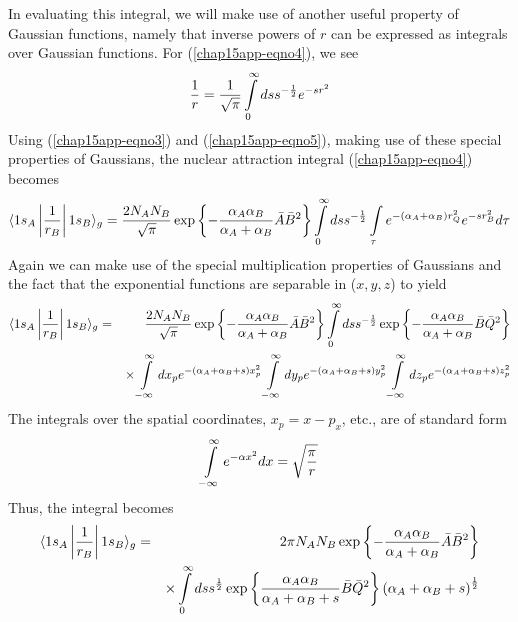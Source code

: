 In evaluating this integral, we will make use of another useful
property of Gaussian functions, namely that inverse powers of $r$ can
be expressed as integrals over Gaussian functions. For
(\ref{chap15app-eqno4}), we see
\begin{equation}
{1 \over r} = {1 \over \sqrt{\pi}} \int\limits^{\infty}_{0} dss^{-{1 
\over 2}} e^{-sr^2}
\label{chap15app-eqno5}
\end{equation}
Using (\ref{chap15app-eqno3}) and (\ref{chap15app-eqno5}), making use
of these special properties of Gaussians, the nuclear attraction
integral (\ref{chap15app-eqno4}) becomes
\begin{equation}
\langle 1s_A \left| {1 \over r_B} \right| 1s_B \rangle_g = {2N_AN_B 
\over \sqrt{\pi}} \exp \left\{ - {\alpha_A \alpha_B \over \alpha_A + 
\alpha_B} {\bar{A}} {\bar{B}}^2\right\} \int\limits^{\infty}_{0} 
dss^{-{1 \over 2}} \int\limits_{\tau} e^{-(\alpha_A+ \alpha_B)r^2_Q} 
e^{-sr^2_B} d \tau
\end{equation}
Again we can make use of the special multiplication properties of Gaussians
and the fact that the exponential functions are separable in ($x, y, z$) to 
yield
\begin{eqnarray}
\langle 1s_A \left| {1 \over r_B} \right| 1s_B \rangle_g & = &
{2N_AN_B \over \sqrt{\pi}} \exp \left\{ - {\alpha_A \alpha_B \over \alpha_A + 
\alpha_B} {\bar{A}} {\bar{B}}^2\right\} \int\limits^{\infty}_{0} 
dss^{-{1 \over 2}} \exp \left\{ - {\alpha_A \alpha_B \over \alpha_A + 
\alpha_B} {\bar{B}} {\bar{Q}}^2\right\}\cr
&& \times \int\limits^{\infty}_{- \infty} dx_p 
e^{-(\alpha_A+\alpha_B+s)x^2_p} \int\limits^{\infty}_{-\infty} dy_p 
e^{-(\alpha_A+\alpha_B+s)y^2_p} \int\limits^{\infty}_{-\infty} dz_p 
e^{-(\alpha_A+\alpha_B+s)z^2_p}
\end{eqnarray}
The integrals over the spatial coordinates, $x_p=x-p_x$, etc., are of standard
form
\begin{equation}
\int\limits^{\infty}_{-\infty} e^{-\alpha x^2} dx = \sqrt{{\pi \over r}}
\end{equation}
Thus, the integral becomes
\begin{eqnarray}
\langle 1s_A \left| {1 \over r_B} \right| 1s_B \rangle_g & = &2 \pi 
N_AN_B \exp \left\{ - {\alpha_A \alpha_B \over \alpha_A + 
\alpha_B} {\bar{A}} {\bar{B}}^2\right\}\cr
&& \times \int\limits^{\infty}_{0} dss^{{1 \over 2}} \exp \left\{ 
{\alpha_A \alpha_B \over \alpha_A + 
\alpha_B +s} {\bar{B}} {\bar{Q}}^2\right\} \left( \alpha_A + \alpha_B + 
s \right)^{{1 \over 2}}
\end{eqnarray}
